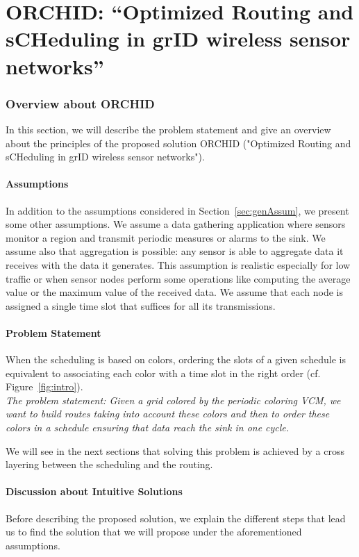 \clearpage
\part{ORCHID: ``Optimized Routing and sCHeduling in grID wireless sensor networks''}
\section{Overview about ORCHID}\label{sec:overview}
In this section, we will describe the problem statement and give an overview about the principles of the proposed solution ORCHID ("Optimized Routing and sCHeduling in grID wireless sensor networks").

\subsection{Assumptions}\label{sec:assumpProblem}
In addition to the assumptions considered in Section~\ref{sec:genAssum}, we present some other assumptions. We assume a data gathering application where sensors monitor a region and transmit periodic measures or alarms to the sink. We assume also that aggregation is possible: any sensor is able to aggregate data it receives with the data it generates. This assumption is realistic especially for low traffic or when sensor nodes perform some operations like computing the average value or the maximum value of the received data. We assume that each node is assigned a single time slot that suffices for all its transmissions. 

\subsection{Problem Statement}
When the scheduling is based on colors, ordering the slots of a given schedule is equivalent to associating each color with a time slot in the right order (cf. Figure~\ref{fig:intro}).\\

\textit{The problem statement: 
Given a grid colored by the periodic coloring VCM, we want to build routes taking into account these colors and then to order these colors in a schedule ensuring that data reach the sink in one cycle. 
}

We will see in the next sections that solving this problem is achieved by a cross layering between the scheduling and the routing.


\subsection{Discussion about Intuitive Solutions}
Before describing the proposed solution, we explain the different steps that lead us to find the solution that we will propose under the aforementioned assumptions.

